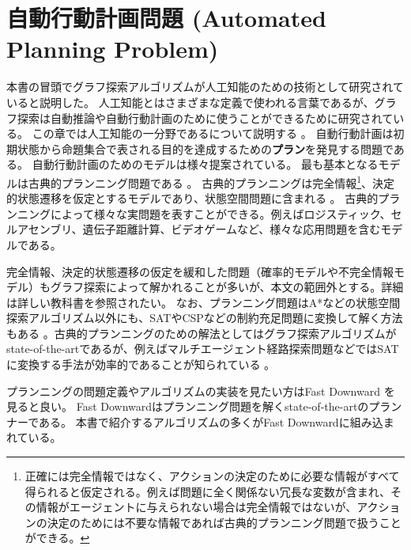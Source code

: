 
\chapter{自動行動計画問題 (Automated Planning Problem)}
\label{ch:classical-planning}

本書の冒頭でグラフ探索アルゴリズムが人工知能のための技術として研究されていると説明した。
人工知能とはさまざまな定義で使われる言葉であるが、グラフ探索は自動推論や自動行動計画のために使うことができるために研究されている。
この章では人工知能の一分野であるについて説明する \cite{ghallab:04}。
自動行動計画は初期状態から命題集合で表される目的を達成するための{\bf プラン}を発見する問題である。
自動行動計画のためのモデルは様々提案されている。
最も基本となるモデルは古典的プランニング問題である \cite{fikes:71}。
古典的プランニングは完全情報\footnote{正確には完全情報ではなく、アクションの決定のために必要な情報がすべて得られると仮定される。例えば問題に全く関係ない冗長な変数が含まれ、その情報がエージェントに与えられない場合は完全情報ではないが、アクションの決定のためには不要な情報であれば古典的プランニング問題で扱うことができる。}、決定的状態遷移を仮定とするモデルであり、状態空間問題に含まれる \cite{fikes:71}。
古典的プランニングによって様々な実問題を表すことができる。例えばロジスティック\cite{helmert2010scanalyzer,sousa2013toward}、セルアセンブリ\cite{asai2014fully}、遺伝子距離計算\cite{erdem2005genome}、ビデオゲーム\cite{lipovetzky2015a}など、様々な応用問題を含むモデルである。

完全情報、決定的状態遷移の仮定を緩和した問題（確率的モデルや不完全情報モデル）もグラフ探索によって解かれることが多いが、本文の範囲外とする。詳細は詳しい教科書を参照されたい\cite{russelln03}。
なお、プランニング問題はA*などの状態空間探索アルゴリズム以外にも、SATやCSPなどの制約充足問題に変換して解く方法もある \cite{ernst1997automatic,do2001planning}。古典的プランニングのための解法としてはグラフ探索アルゴリズムがstate-of-the-artであるが、例えばマルチエージェント経路探索問題などではSATに変換する手法が効率的であることが知られている \cite{sharon2015conflict}。

プランニングの問題定義やアルゴリズムの実装を見たい方はFast Downward \cite{helmert2006}を見ると良い。
Fast Downwardはプランニング問題を解くstate-of-the-artのプランナーである。
本書で紹介するアルゴリズムの多くがFast Downwardに組み込まれている。


